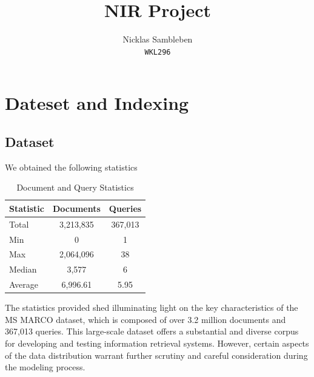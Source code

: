 \documentclass[11pt,a4paper]{article}
\title{NIR Project}
\author{Nicklas Sambleben \\
  \texttt{WKL296} \\ }
\date{}
\begin{document}
\maketitle

\section{Dateset and Indexing}

\subsection*{Dataset}
We obtained the following statistics

\begin{table}[htbp]
    \centering
    \label{tab:statistics}
    \begin{tabular}{lcc}
        \toprule
        \multicolumn{1}{c}{\textbf{Statistic}} & \multicolumn{1}{c}{\textbf{Documents}} & \multicolumn{1}{c}{\textbf{Queries}} \\
        \midrule
        Total                                  & 3,213,835                              & 367,013                              \\
        Min                                    & 0                                      & 1                                    \\
        Max                                    & 2,064,096                              & 38                                   \\
        Median                                 & 3,577                                  & 6                                    \\
        Average                                & 6,996.61                               & 5.95                                 \\
        \bottomrule
    \end{tabular}
    \caption{Document and Query Statistics}
\end{table}

The statistics provided shed illuminating light on the key
characteristics of the MS MARCO dataset, which is composed of over
3.2 million documents and 367,013 queries. This large-scale dataset
offers a substantial and diverse corpus for developing and testing
information retrieval systems. However, certain aspects of the data
distribution warrant further scrutiny and careful consideration
during the modeling process.
\end{document}
